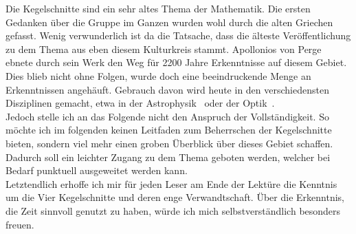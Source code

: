 Die Kegelschnitte sind ein sehr altes Thema der Mathematik. Die ersten Gedanken über die Gruppe im Ganzen wurden wohl durch die alten Griechen gefasst. Wenig verwunderlich ist da die Tatsache, dass die älteste Veröffentlichung zu dem Thema aus eben diesem Kulturkreis stammt. Apollonios von Perge~\cite{Perge:1967} ebnete durch sein Werk den Weg für 2200 Jahre Erkenntnisse auf diesem Gebiet.\\
Dies blieb nicht ohne Folgen, wurde doch eine beeindruckende Menge an Erkenntnissen angehäuft. Gebrauch davon wird heute in den verschiedensten Disziplinen gemacht, etwa in der Astrophysik~\cite[3.8]{Jennings:1994} oder der Optik~\cite[3.5]{Jennings:1994}.\\
Jedoch stelle ich an das Folgende nicht den Anspruch der Vollständigkeit. So möchte ich im folgenden keinen Leitfaden zum Beherrschen der Kegelschnitte bieten, sondern viel mehr einen groben Überblick über dieses Gebiet schaffen. Dadurch soll ein leichter Zugang zu dem Thema geboten werden, welcher bei Bedarf punktuell ausgeweitet werden kann.\\
Letztendlich erhoffe ich mir für jeden Leser am Ende der Lektüre die Kenntnis um die Vier Kegelschnitte und deren enge Verwandtschaft. Über die Erkenntnis, die Zeit sinnvoll genutzt zu haben, würde ich mich selbstverständlich besonders freuen.\\